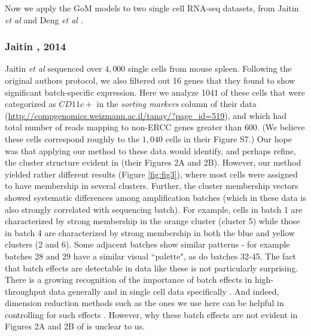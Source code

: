 Now we apply the GoM models to two single cell RNA-seq datasets, from Jaitin \textit{et al} \cite{Jaitin2014} and Deng \textit{et al} \cite{Deng2014}.  

\subsubsection{Jaitin , 2014}

Jaitin \textit{et al} sequenced over $4,000$ single cells from mouse spleen. Following the original authors protocol, we also filtered out 16 genes that they found to show significant batch-specific expression. Here we analyze 1041 of these cells that were categorized as $CD11c+$ in the \textit{sorting markers} column of their data (\url{http://compgenomics.weizmann.ac.il/tanay/?page_id=519}), and which had total number of reads mapping to non-ERCC genes greater than $600$. (We believe these cells correspond roughly to the $1,040$ cells in their Figure S7.)   Our hope was that applying our method to these data would identify, and perhaps refine, the cluster structure evident in 
\cite{Jaitin2014} (their Figures 2A and 2B). However, our method yielded rather different results (Figure \ref{fig:fig3}), where most cells were assigned to have membership
in several clusters. Further, the cluster membership vectors showed systematic differences among amplification batches (which in these data is also strongly correlated with sequencing batch). For example, cells in batch 1 are characterized by strong membership in the orange cluster (cluster 5) while those in batch 4 are characterized
by strong membership in both the blue and yellow clusters (2 and 6). Some adjacent batches show similar patterns - for example batches 28 and 29 have a similar visual ``palette", as do batches 32-45. The fact that batch effects are detectable in data like these is not particularly surprising. There is a growing recognition of the importance of batch effects in high-throughput data generally \cite{Leek2010} and in single cell data specifically \cite{Hicks2015}. And indeed, dimension reduction methods such as the ones we use here can be helpful in controlling for such effects \cite{Leek2007} \cite{Stegle2012}. However, why these batch effects are not evident in Figures 2A and 2B of \cite{Jaitin2014} is unclear to us. 



